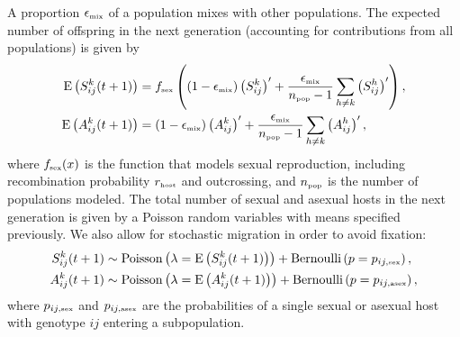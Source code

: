 \documentclass{article}\usepackage[]{graphicx}\usepackage[]{color}
\begin{document}
A proportion $\epsilon_{\textrm{\tiny mix}}$ of a population mixes with other populations.
The expected number of offspring in the next generation (accounting for contributions from all populations) is given by
\begin{equation}
\begin{aligned}
\mathrm{E}\left(S_{ij}^k(t+1)\right) &= f_{\textrm{\tiny sex}}\left((1 - \epsilon_{\textrm{\tiny mix}}) \left(S_{ij}^k\right)' + \frac{\epsilon_{\textrm{\tiny mix}}}{n_{\textrm{\tiny pop}}-1} \sum_{h \neq k} \left(S_{ij}^h\right)'\right),\\
\mathrm{E}\left(A_{ij}^k(t+1)\right) &= (1 - \epsilon_{\textrm{\tiny mix}}) \left(A_{ij}^k\right)' + \frac{\epsilon_{\textrm{\tiny mix}}}{n_{\textrm{\tiny pop}}-1} \sum_{h \neq k} \left(A_{ij}^h\right)',\\
\end{aligned}
\end{equation}
where $f_{\textrm{\tiny sex}}(x)$ is the function that models sexual reproduction, including recombination probability $r_{\textrm{\tiny host}}$ and outcrossing, and $n_{\textrm{\tiny pop}}$ is the number of populations modeled.
The total number of sexual and asexual hosts in the next generation is given by a Poisson random variables with means specified previously. We also allow for stochastic migration in order to avoid fixation:
\begin{equation}
\begin{aligned}
S_{ij}^k(t+1) &\sim \mathrm{Poisson}\left(\lambda=\mathrm{E}\left(S_{ij}^k(t+1)\right)\right) + \mathrm{Bernoulli}\left(p=p_{ij,\textrm{\tiny sex}}\right),\\
A_{ij}^k(t+1) &\sim \mathrm{Poisson}\left(\lambda=\mathrm{E}\left(A_{ij}^k(t+1)\right)\right) + \mathrm{Bernoulli}\left(p=p_{ij, \textrm{\tiny asex}}\right),
\end{aligned}
\end{equation}
where $p_{ij,\textrm{\tiny sex}}$ and $p_{ij, \textrm{\tiny asex}}$ are the probabilities of a single sexual or asexual host with genotype $ij$ entering a subpopulation.
\end{document}
